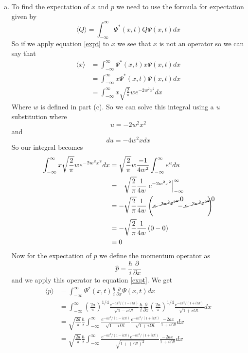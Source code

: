 \documentclass[11pt]{article}
\numberwithin{equation}{section}
\newcommand{\expt}[1]{\langle{#1}\rangle}
\begin{document}
\begin{enumerate}[(a)]
\item
To find the expectation of $x$ and $p$ we need to use the formula for expectation given by
\begin{equation}
\expt{Q} = \int_{-\infty}^{\infty}\Psi^*(x,t)Q\Psi(x,t)dx
\label{expt}
\end{equation}
So if we apply equation \ref{expt} to $x$ we see that $x$ is not an operator so we can say that
\begin{align*}
\expt{x} &= \int_{-\infty}^{\infty}\Psi^*(x,t)x\Psi(x,t)dx\\
&= \int_{-\infty}^{\infty}x\Psi^*(x,t)\Psi(x,t)dx\\
&= \int_{-\infty}^{\infty}x\sqrt{\frac{2}{\pi}}we^{-2w^2x^2}dx
\end{align*}
Where $w$ is defined in part (c). So we can solve this integral using a $u$ substitution where
$$u = -2w^2x^2$$
and 
$$du = -4w^2xdx$$
So our integral becomes
\begin{align*}
\int_{-\infty}^{\infty}x\sqrt{\frac{2}{\pi}}we^{-2w^2x^2}dx &= \sqrt{\frac{2}{\pi}}w\frac{-1}{4w^2}\int_{-\infty}^{\infty}e^{u}du\\
&= -\sqrt{\frac{2}{\pi}}\frac{1}{4w}\left.e^{-2w^2x^2}\right|_{-\infty}^{\infty}\\
&= -\sqrt{\frac{2}{\pi}}\frac{1}{4w}\left(\cancelto{0}{e^{-2w^2x^2}}-\cancelto{0}{e^{-2w^2x^2}}\right)\\
&= -\sqrt{\frac{2}{\pi}}\frac{1}{4w}\left(0-0\right)\\
&= 0
\end{align*}
Now for the expectation of $p$ we define the momentum operator as
$$\hat{p} = \frac{\hbar}{i}\frac{\partial}{\partial x}$$
and we apply this operator to equation \ref{expt}. We get
\begin{align*}
\expt{p} &= \int_{-\infty}^{\infty}\Psi^*(x,t)\frac{\hbar}{i}\frac{\partial}{\partial x}\Psi(x,t)dx\\
&= \int_{-\infty}^{\infty}\left(\frac{2a}{\pi}\right)^{1/4}\frac{e^{-ax^2/(1-i\Omega t)}}{\sqrt{1 - i\Omega t}}\frac{\hbar}{i}\frac{\partial}{\partial x}\left(\frac{2a}{\pi}\right)^{1/4}\frac{e^{-ax^2/(1+i\Omega t)}}{\sqrt{1 + i\Omega t}}dx\\
&= \sqrt{\frac{2a}{\pi}}\frac{\hbar}{i}\int_{-\infty}^{\infty}\frac{e^{-ax^2/(1-i\Omega t)}}{\sqrt{1 - i\Omega t}}\frac{e^{-ax^2/(1+i\Omega t)}}{\sqrt{1 + i\Omega t}}\frac{-2ax}{1+i\Omega t}dx\\
&= \sqrt{\frac{2a}{\pi}}\frac{\hbar}{i}\int_{-\infty}^{\infty}\frac{e^{-ax^2/(1-i\Omega t)}e^{-ax^2/(1+i\Omega t)}}{\sqrt{1 + (\Omega t)^2}}\frac{-2ax}{1+i\Omega t}dx\\

\end{align*}
\end{enumerate}
\end{document}
